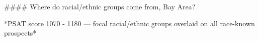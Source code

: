 #### Where do racial/ethnic groups come from, Bay Area?

*PSAT score 1070 - 1180 — focal racial/ethnic groups overlaid on all race-known prospects*
